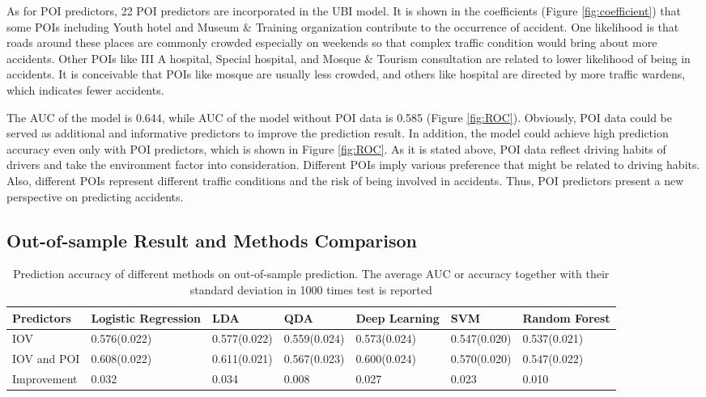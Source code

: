 \documentclass[sii]{ipart}
\theoremstyle{plain}
\begin{document}
As for POI predictors, 22 POI predictors are incorporated in the UBI model. It is shown in the coefficients (Figure \ref{fig:coefficient}) that some POIs including Youth hotel and Museum \& Training organization contribute to the occurrence of accident. One likelihood is that roads around these places are commonly crowded especially on weekends so that complex traffic condition would bring about more accidents. Other POIs like III A hospital, Special hospital, and Mosque \& Tourism consultation are related to lower likelihood of being in accidents. It is conceivable that POIs like mosque are usually less crowded, and others like hospital are directed by more traffic wardens, which indicates fewer accidents.


The AUC of the model is 0.644, while AUC of the model without POI data is 0.585 (Figure \ref{fig:ROC}). Obviously, POI data could be served as additional and informative predictors to improve the prediction result. In addition, the model could achieve high prediction accuracy even only with POI predictors, which is shown in Figure \ref{fig:ROC}. As it is stated above, POI data reflect driving habits of drivers and take the environment factor into consideration. Different POIs imply various preference that might be related to driving habits. Also, different POIs represent different traffic conditions and the risk of being involved in accidents. Thus, POI predictors present a new perspective on predicting accidents.

\subsection{Out-of-sample Result and Methods Comparison}
\begin{table}[h]
	\centering
	\caption{Prediction accuracy of different methods on out-of-sample prediction. The average AUC or accuracy together with their standard deviation in 1000 times test is reported}\label{tab:methods comparison} 
	\vspace{0.5ex}
	\begin{tabular}{lllll|ll}
		\toprule[1pt]
		\toprule[1pt]
		Predictors & Logistic Regression & LDA &	QDA  & Deep Learning & SVM & Random Forest \\
		\midrule[1pt]
		IOV & 0.576(0.022) & 0.577(0.022) & 0.559(0.024) & 0.573(0.024) & 0.547(0.020) & 0.537(0.021) \\
		IOV and POI & 0.608(0.022) & 0.611(0.021) & 0.567(0.023) & 0.600(0.024) & 0.570(0.020) & 0.547(0.022)\\  
		\cline{1-7}
		Improvement & 0.032 & 0.034 & 0.008 & 0.027 & 0.023 & 0.010\\
		\bottomrule[1pt]  
	\end{tabular}
\end{table}
\end{document}
